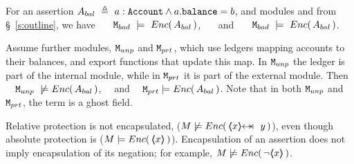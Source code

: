  

\begin{example}
\label{ex:not:encaps}
For an assertion $A_{bal}\  \triangleq\ a:\prg{Account}\wedge a.\prg{balance}=b$, %
and modules \ModB and  \ModC  from \S~\ref{s:outline}, we have  \ \ \ $\mbox{\normalfont{\texttt{M}}}_{{bad}}\ \models\ {Enc(\,  A_{bal} \, )}$, \ \ \ and \ \ \ $\mbox{\normalfont{\texttt{M}}}_{{bad}}\ \models\ {Enc(\,  A_{bal} \, )}$.
\end{example}


\begin{example} Assume   further modules, $\mbox{\normalfont{\texttt{M}}}_{{unp}}$ and $\mbox{\normalfont{\texttt{M}}}_{{prt}}$,  which  use ledgers mapping  accounts to their balances, and export functions that update this map. In  $\mbox{\normalfont{\texttt{M}}}_{{unp}}$ the ledger is  part of the {internal} module, %
while in $\mbox{\normalfont{\texttt{M}}}_{{prt}}$ it is part of the  {external} module.
Then  \ \ $\ModD \ \not\models\encaps{ A_{bal}} $, \ \  and \ \ $\mbox{\normalfont{\texttt{M}}}_{{prt}}  \models {\ensuremath Enc(\,  A_{bal}\, )} $.
Note that in both $\mbox{\normalfont{\texttt{M}}}_{{unp}}$ and $\mbox{\normalfont{\texttt{M}}}_{{prt}}$, the term  is a ghost field. 
\end{example}

\begin{note} Relative protection %
is not encapsulated, (\eg $M \not\models {\encaps{\protectedFrom{x}{y}}}$), even though    absolute protection is
(\eg $M \models {\ensuremath Enc(\, \ensuremath{\langle\!\!\langle x \rangle\!\!\rangle}\, )}$).
Encapsulation of an assertion does not imply encapsulation of its negation; 
 for example,  $M \not\models {{\ensuremath Enc(\, \neg\ensuremath{\langle\!\!\langle x \rangle\!\!\rangle}\, )}}$.
\end{note}


 
%

